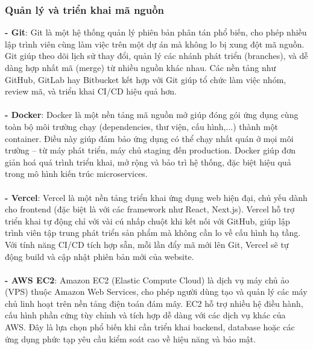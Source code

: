 \documentclass[a4paper,12pt]{article}
\begin{document}
\subsubsection{Quản lý và triển khai mã nguồn}
\textbf{- Git}: Git là một hệ thống quản lý phiên bản phân tán phổ biến, cho phép nhiều lập trình viên cùng làm việc trên một dự án mà không lo bị xung đột mã nguồn. Git giúp theo dõi lịch sử thay đổi, quản lý các nhánh phát triển (branches), và dễ dàng hợp nhất mã (merge) từ nhiều nguồn khác nhau. Các nền tảng như GitHub, GitLab hay Bitbucket kết hợp với Git giúp tổ chức làm việc nhóm, review mã, và triển khai CI/CD hiệu quả hơn.\\ \\
\textbf{- Docker}: Docker là một nền tảng mã nguồn mở giúp đóng gói ứng dụng cùng toàn bộ môi trường chạy (dependencies, thư viện, cấu hình,...) thành một container. Điều này giúp đảm bảo ứng dụng có thể chạy nhất quán ở mọi môi trường – từ máy phát triển, máy chủ staging đến production. Docker giúp đơn giản hoá quá trình triển khai, mở rộng và bảo trì hệ thống, đặc biệt hiệu quả trong mô hình kiến trúc microservices.\\ \\
\textbf{- Vercel}: Vercel là một nền tảng triển khai ứng dụng web hiện đại, chủ yếu dành cho frontend (đặc biệt là với các framework như React, Next.js). Vercel hỗ trợ triển khai tự động chỉ với vài cú nhấp chuột khi kết nối với GitHub, giúp lập trình viên tập trung phát triển sản phẩm mà không cần lo về cấu hình hạ tầng. Với tính năng CI/CD tích hợp sẵn, mỗi lần đẩy mã mới lên Git, Vercel sẽ tự động build và cập nhật phiên bản mới của website.\\ \\
\textbf{- AWS EC2}: Amazon EC2 (Elastic Compute Cloud) là dịch vụ máy chủ ảo (VPS) thuộc Amazon Web Services, cho phép người dùng tạo và quản lý các máy chủ linh hoạt trên nền tảng điện toán đám mây. EC2 hỗ trợ nhiều hệ điều hành, cấu hình phần cứng tùy chỉnh và tích hợp dễ dàng với các dịch vụ khác của AWS. Đây là lựa chọn phổ biến khi cần triển khai backend, database hoặc các ứng dụng phức tạp yêu cầu kiểm soát cao về hiệu năng và bảo mật.\\
\end{document}
